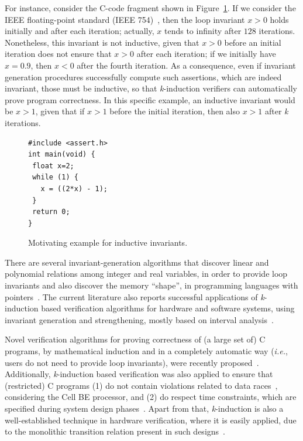 \documentclass[format=acmsmall, review=false, screen=true]{acmart}
\begin{document}
For instance, consider the C-code fragment shown in Figure~\ref{figure:inductive-invariant}. If we consider the IEEE floating-point standard (IEEE 754)~\cite{4610935,Goldberg91whatevery}, then  the loop invariant $x>0$ holds initially and after each iteration; actually, $x$ tends to infinity after $128$ iterations. Nonetheless, this invariant is not inductive, given that $x>0$ before an initial iteration does not ensure that $x>0$ after each iteration; if we initially have $x=0.9$, then $x<0$ after the fourth iteration. As a consequence, even if invariant generation procedures successfully compute such assertions, which are indeed invariant, those must be inductive, so that \textit{k}-induction verifiers can automatically prove program correctness. In this specific example, an inductive invariant would be $x>1$, given that if $x>1$ before the initial iteration, then also $x>1$ after \textit{k} iterations.
%
\begin{figure}[h]
\centering
\begin{minipage}{0.45\textwidth}
\begin{lstlisting}
#include <assert.h>
int main(void) {
 float x=2;
 while (1) {
   x = ((2*x) - 1);
 }
 return 0;
}
\end{lstlisting}
\end{minipage}
\caption{Motivating example for inductive invariants.}
\label{figure:inductive-invariant}
\end{figure}


There are several invariant-generation algorithms that discover linear and polynomial relations among integer and real variables, in order to provide loop invariants and also discover the memory ``shape'', in programming languages with pointers~\cite{pips:2013,Henry:2012}. The current literature also reports successful applications of \textit{k}-induction based verification algorithms for hardware and software systems, using invariant generation and strengthening, mostly based on interval analysis~\cite{Beyer15}. 

Novel verification algorithms for proving correctness of (a large set of) C programs, by mathematical induction and in a completely automatic way ({\it i.e.}, users do not need to provide loop invariants), were recently proposed~\cite{Gadelha15,Beyer15,Brain15,Rocha15,Kinductor,Rocha17}. Additionally, \textit{k}-induction based verification was also applied to ensure that (restricted) C programs (1) do not contain violations related to data races~\cite{Donaldson10}, considering the Cell BE processor, and (2) do respect time constraints, which are specified during system design phases~\cite{EenS03}. Apart from that, \textit{k}-induction is also a well-established technique in hardware verification, where it is easily applied, due to the monolithic transition relation present in such designs~\cite{EenS03,Sheera00,GrosseLD09}.
\end{document}
